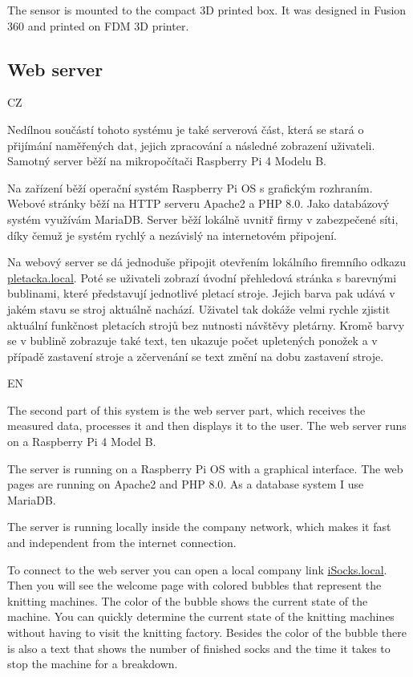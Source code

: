 \documentclass[12pt, a4paper]{article}
\begin{document}
The sensor is mounted to the compact 3D printed box.
It was designed in Fusion 360 and printed on FDM 3D printer.

\subsection*{Web server}

CZ

Nedílnou součástí tohoto systému je také serverová část, která se stará o přijímání naměřených dat, jejich zpracování a následné zobrazení uživateli.
Samotný server běží na mikropočítači Raspberry Pi 4 Modelu B.

Na zařízení běží operační systém Raspberry Pi OS s grafickým rozhraním.
Webové stránky běží na HTTP serveru Apache2 a PHP 8.0.
Jako databázový systém využívám MariaDB.
Server běží lokálně uvnitř firmy v zabezpečené síti, díky čemuž je systém rychlý a nezávislý na internetovém připojení.

Na webový server se dá jednoduše připojit otevřením lokálního firemního odkazu \newline\href{http://pletacka.local}{pletacka.local}.
Poté se uživateli zobrazí úvodní přehledová stránka s barevnými bublinami, které představují jednotlivé pletací stroje.
Jejich barva pak udává v jakém stavu se stroj aktuálně nachází. Uživatel tak dokáže velmi rychle zjistit aktuální funkčnost pletacích strojů bez nutnosti návštěvy pletárny.
Kromě barvy se v bublině zobrazuje také text, ten ukazuje počet upletených ponožek a v případě zastavení stroje a zčervenání se text změní na dobu zastavení stroje.

EN

The second part of this system is the web server part, which receives the measured data, processes it and then displays it to the user.
The web server runs on a Raspberry Pi 4 Model B.

The server is running on a Raspberry Pi OS with a graphical interface.
The web pages are running on Apache2 and PHP 8.0.
As a database system I use MariaDB.

The server is running locally inside the company network, which makes it fast and independent from the internet connection.

To connect to the web server you can open a local company link \newline\href{http://iSocks.local}{iSocks.local}.
Then you will see the welcome page with colored bubbles that represent the knitting machines.
The color of the bubble shows the current state of the machine.
You can quickly determine the current state of the knitting machines without having to visit the knitting factory.
Besides the color of the bubble there is also a text that shows the number of finished socks and the time it takes to stop the machine for a breakdown.
\end{document}
